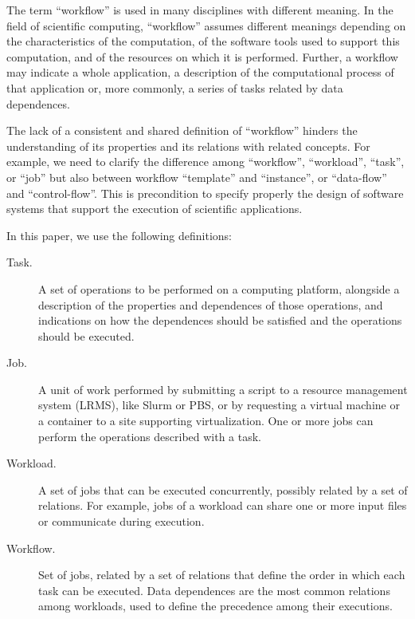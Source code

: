 The term ``workflow'' is used in many disciplines with different meaning. In the
field of scientific computing, ``workflow'' assumes different meanings depending
on the characteristics of the computation, of the software tools used to support
this computation, and of the resources on which it is performed. Further, a
workflow may indicate a whole application, a description of the computational
process of that application or, more commonly, a series of tasks related by data
dependences.

The lack of a consistent and shared definition of ``workflow'' hinders the
understanding of its properties and its relations with related concepts. For
example, we need to clarify the difference among ``workflow'', ``workload'',
``task'', or ``job'' but also between workflow ``template'' and ``instance'', or
``data-flow'' and ``control-flow''. This is precondition to specify properly the
design of software systems that support the execution of scientific
applications.

In this paper, we use the following definitions:

\begin{description}

  \item[Task.] A set of operations to be performed on a computing platform,
  alongside a description of the properties and dependences of those operations,
  and indications on how the dependences should be satisfied and the operations
  should be executed.

  \item[Job.] A unit of  work performed by submitting a script to a resource
  management system (LRMS), like  Slurm or PBS, or by requesting a virtual
  machine or a container to a site supporting virtualization. One or more jobs
  can perform the operations described with a task.

  \item[Workload.] A set of jobs that can be executed concurrently, possibly
  related by a set of relations. For example, jobs of a workload can share one
  or more input files or communicate during execution.

  \item[Workflow.] Set of jobs, related by a set of relations that define the
  order in which each task can be executed. Data dependences are the most common
  relations among workloads, used to define the precedence among their
  executions.

\end{description}
